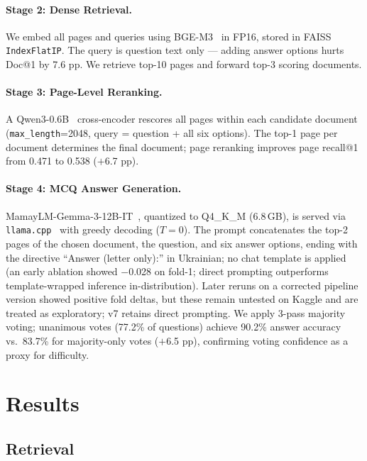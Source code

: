 \documentclass[11pt]{article}
\begin{document}
\paragraph{Stage 2: Dense Retrieval.}
We embed all pages and queries using BGE-M3~\cite{chen2024bge} in FP16, stored in FAISS~\cite{johnson2019billion} \texttt{IndexFlatIP}. The query is question text only — adding answer options hurts Doc@1 by 7.6 pp. We retrieve top-10 pages and forward top-3 scoring documents.

\paragraph{Stage 3: Page-Level Reranking.}
A Qwen3-0.6B~\cite{qwen3_2025} cross-encoder rescores all pages within each candidate document (\texttt{max\_length}=2048, query = question + all six options). The top-1 page per document determines the final document; page reranking improves page recall@1 from 0.471 to 0.538 ($+$6.7 pp).

\paragraph{Stage 4: MCQ Answer Generation.}
MamayLM-Gemma-3-12B-IT~\cite{mamaylm2025}, quantized to Q4\_K\_M (6.8\,GB), is served via \texttt{llama.cpp}~\cite{llamacpp} with greedy decoding ($T=0$). The prompt concatenates the top-2 pages of the chosen document, the question, and six answer options, ending with the directive ``Answer (letter only):'' in Ukrainian; no chat template is applied (an early ablation showed $-$0.028 on fold-1; direct prompting outperforms template-wrapped inference in-distribution). Later reruns on a corrected pipeline version showed positive fold deltas, but these remain untested on Kaggle and are treated as exploratory; v7 retains direct prompting. We apply 3-pass majority voting; unanimous votes (77.2\% of questions) achieve 90.2\% answer accuracy vs.\ 83.7\% for majority-only votes ($+$6.5 pp), confirming voting confidence as a proxy for difficulty.

\section{Results}
\label{sec:results}

\subsection{Retrieval}
\label{sec:retrieval}
\end{document}
